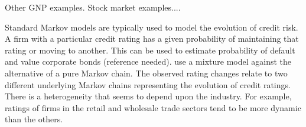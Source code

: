 \documentclass[12pt, a4paper, oneside]{article} %
\begin{document}
Other GNP examples.  Stock market examples....

Standard Markov models are typically used to model the evolution of credit risk.  A firm with a particular credit rating has a given probability of maintaining that rating or moving to another.  This can be used to estimate probability of default and value corporate bonds (reference needed).  \citet{frydman2008credit} use a mixture model against the alternative of a pure Markov chain. The observed rating changes relate to two different underlying Markov chains representing the evolution of credit ratings.  There is a heterogeneity that seems to depend upon the industry.  For example, ratings of firms in the retail and wholesale trade sectors tend to be more dynamic than the others. 






\end{document}
